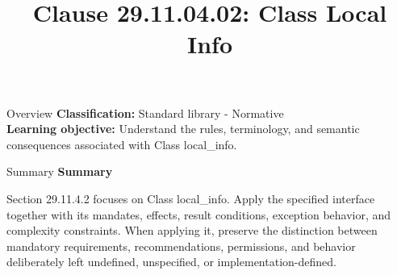 \documentclass[10pt,letterpaper]{article}
\title{Clause 29.11.04.02: Class Local Info}
\author{}
\date{}
\begin{document}
\maketitle
\begin{CornellOverviewBox}{Overview}
\textbf{Classification:} Standard library - Normative\\[2pt]
\textbf{Learning objective:} Understand the rules, terminology, and semantic consequences associated with Class local\_info.
\end{CornellOverviewBox}\begin{CornellSummaryBox}{Summary}
{\sffamily\bfseries\color{Accent} Summary}\par\vspace{3pt}Section 29.11.4.2 focuses on Class local\_info. Apply the specified interface together with its mandates, effects, result conditions, exception behavior, and complexity constraints. When applying it, preserve the distinction between mandatory requirements, recommendations, permissions, and behavior deliberately left undefined, unspecified, or implementation-defined.
\end{CornellSummaryBox}
\end{document}
